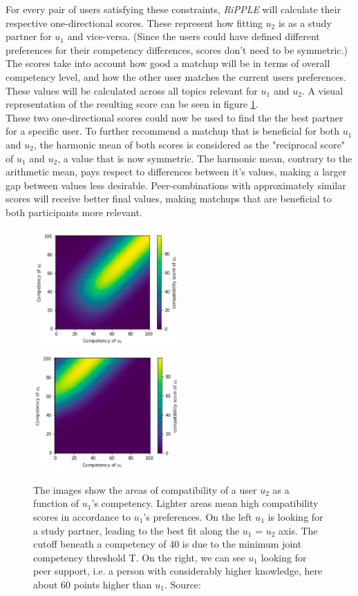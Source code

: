 \documentclass[conference]{IEEEtran}
\begin{document}
For every pair of users satisfying these constraints, \textit{RiPPLE} will calculate their respective one-directional scores. These represent how fitting \(u_2\) is as a study partner for \(u_1\) and vice-versa. (Since the users could have defined different preferences for their competency differences, scores don't need to be symmetric.) The scores take into account how good a matchup will be in terms of overall competency level, and how the other user matches the current users preferences. These values will be calculated across all topics relevant for \(u_1\) and \(u_2\). A visual representation of the resulting score can be seen in figure \ref{f:Seeking}.\\
These two one-directional scores could now be used to find the the best partner for a specific user. To further recommend a matchup that is beneficial for both \(u_1\) and \(u_2\), the harmonic mean of both scores is considered as the "reciprocal score" of \(u_1\) and \(u_2\), a value that is now symmetric. \cite{prabhakar2017reciprocal} The harmonic mean, contrary to the arithmetic mean, pays respect to differences between it's values, making a larger gap between values less desirable. Peer-combinations with approximately similar scores will receive better final values, making matchups that are beneficial to both participants more relevant.\\
\begin{figure}[!t]
	\includegraphics[width=0.5\textwidth]{g/SeekingPartnerCompatibility.PNG}
	\includegraphics[width=0.5\textwidth]{g/SeekingSupportCompatibility.PNG}
	\caption{The images show the areas of compatibility of a user \(u_2\) as a function of \(u_1\)'s competency. Lighter areas mean high compatibility scores in accordance to \(u_1\)'s preferences. On the left \(u_1\) is looking for a study partner, leading to the best fit along the \(u_1\) = \(u_2\) axis. The cutoff beneath a competency of 40 is due to the minimum joint competency threshold T. On the right, we can see \(u_1\) looking for peer support, i.e. a person with considerably higher knowledge, here about 60 points higher than \(u_1\). Source: \cite{potts2018reciprocal}}
	\label{f:Seeking}
\end{figure}
\end{document}
